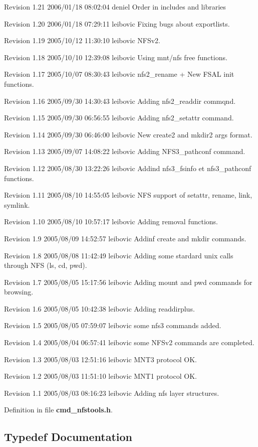 Revision 1.21 2006/01/18 08:02:04 deniel Order in includes and libraries

Revision 1.20 2006/01/18 07:29:11 leibovic Fixing bugs about exportlists.

Revision 1.19 2005/10/12 11:30:10 leibovic NFSv2.

Revision 1.18 2005/10/10 12:39:08 leibovic Using mnt/nfs free functions.

Revision 1.17 2005/10/07 08:30:43 leibovic nfs2\_\-rename + New FSAL init functions.

Revision 1.16 2005/09/30 14:30:43 leibovic Adding nfs2\_\-readdir commqnd.

Revision 1.15 2005/09/30 06:56:55 leibovic Adding nfs2\_\-setattr command.

Revision 1.14 2005/09/30 06:46:00 leibovic New create2 and mkdir2 args format.

Revision 1.13 2005/09/07 14:08:22 leibovic Adding NFS3\_\-pathconf command.

Revision 1.12 2005/08/30 13:22:26 leibovic Addind nfs3\_\-fsinfo et nfs3\_\-pathconf functions.

Revision 1.11 2005/08/10 14:55:05 leibovic NFS support of setattr, rename, link, symlink.

Revision 1.10 2005/08/10 10:57:17 leibovic Adding removal functions.

Revision 1.9 2005/08/09 14:52:57 leibovic Addinf create and mkdir commands.

Revision 1.8 2005/08/08 11:42:49 leibovic Adding some stardard unix calls through NFS (ls, cd, pwd).

Revision 1.7 2005/08/05 15:17:56 leibovic Adding mount and pwd commands for browsing.

Revision 1.6 2005/08/05 10:42:38 leibovic Adding readdirplus.

Revision 1.5 2005/08/05 07:59:07 leibovic some nfs3 commands added.

Revision 1.4 2005/08/04 06:57:41 leibovic some NFSv2 commands are completed.

Revision 1.3 2005/08/03 12:51:16 leibovic MNT3 protocol OK.

Revision 1.2 2005/08/03 11:51:10 leibovic MNT1 protocol OK.

Revision 1.1 2005/08/03 08:16:23 leibovic Adding nfs layer structures.

Definition in file {\bf cmd\_\-nfstools.h}.

\subsection{Typedef Documentation}
